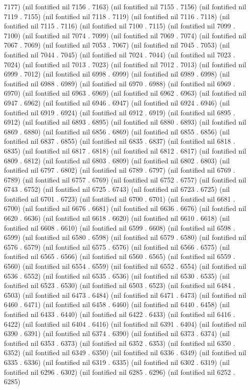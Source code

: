 7177) (nil fontified nil 7156 . 7163) (nil fontified nil 7155 . 7156) (nil fontified nil 7119 . 7155) (nil fontified nil 7118 . 7119) (nil fontified nil 7116 . 7118) (nil fontified nil 7115 . 7116) (nil fontified nil 7100 . 7115) (nil fontified nil 7099 . 7100) (nil fontified nil 7074 . 7099) (nil fontified nil 7069 . 7074) (nil fontified nil 7067 . 7069) (nil fontified nil 7053 . 7067) (nil fontified nil 7045 . 7053) (nil fontified nil 7044 . 7045) (nil fontified nil 7024 . 7044) (nil fontified nil 7023 . 7024) (nil fontified nil 7013 . 7023) (nil fontified nil 7012 . 7013) (nil fontified nil 6999 . 7012) (nil fontified nil 6998 . 6999) (nil fontified nil 6989 . 6998) (nil fontified nil 6988 . 6989) (nil fontified nil 6970 . 6988) (nil fontified nil 6969 . 6970) (nil fontified nil 6963 . 6969) (nil fontified nil 6962 . 6963) (nil fontified nil 6947 . 6962) (nil fontified nil 6946 . 6947) (nil fontified nil 6924 . 6946) (nil fontified nil 6919 . 6924) (nil fontified nil 6912 . 6919) (nil fontified nil 6895 . 6912) (nil fontified nil 6893 . 6895) (nil fontified nil 6880 . 6893) (nil fontified nil 6869 . 6880) (nil fontified nil 6856 . 6869) (nil fontified nil 6855 . 6856) (nil fontified nil 6837 . 6855) (nil fontified nil 6835 . 6837) (nil fontified nil 6818 . 6835) (nil fontified nil 6817 . 6818) (nil fontified nil 6812 . 6817) (nil fontified nil 6809 . 6812) (nil fontified nil 6803 . 6809) (nil fontified nil 6802 . 6803) (nil fontified nil 6797 . 6802) (nil fontified nil 6789 . 6797) (nil fontified nil 6769 . 6789) (nil fontified nil 6757 . 6769) (nil fontified nil 6752 . 6757) (nil fontified nil 6743 . 6752) (nil fontified nil 6725 . 6743) (nil fontified nil 6723 . 6725) (nil fontified nil 6701 . 6723) (nil fontified nil 6700 . 6701) (nil fontified nil 6681 . 6700) (nil fontified nil 6676 . 6681) (nil fontified nil 6636 . 6676) (nil fontified nil 6620 . 6636) (nil fontified nil 6618 . 6620) (nil fontified nil 6610 . 6618) (nil fontified nil 6608 . 6610) (nil fontified nil 6599 . 6608) (nil fontified nil 6598 . 6599) (nil fontified nil 6580 . 6598) (nil fontified nil 6579 . 6580) (nil fontified nil 6576 . 6579) (nil fontified nil 6575 . 6576) (nil fontified nil 6566 . 6575) (nil fontified nil 6565 . 6566) (nil fontified nil 6560 . 6565) (nil fontified nil 6559 . 6560) (nil fontified nil 6554 . 6559) (nil fontified nil 6552 . 6554) (nil fontified nil 6536 . 6552) (nil fontified nil 6535 . 6536) (nil fontified nil 6530 . 6535) (nil fontified nil 6523 . 6530) (nil fontified nil 6503 . 6523) (nil fontified nil 6484 . 6503) (nil fontified nil 6473 . 6484) (nil fontified nil 6471 . 6473) (nil fontified nil 6460 . 6471) (nil fontified nil 6458 . 6460) (nil fontified nil 6440 . 6458) (nil fontified nil 6433 . 6440) (nil fontified nil 6422 . 6433) (nil fontified nil 6416 . 6422) (nil fontified nil 6404 . 6416) (nil fontified nil 6391 . 6404) (nil fontified nil 6390 . 6391) (nil fontified nil 6374 . 6390) (nil fontified nil 6373 . 6374) (nil fontified nil 6353 . 6373) (nil fontified nil 6352 . 6353) (nil fontified nil 6350 . 6352) (nil fontified nil 6349 . 6350) (nil fontified nil 6336 . 6349) (nil fontified nil 6335 . 6336) (nil fontified nil 6319 . 6335) (nil fontified nil 6302 . 6319) (nil fontified nil 6296 . 6302) (nil fontified nil 6285 . 6296) (nil fontified nil 6252 . 6285) 
